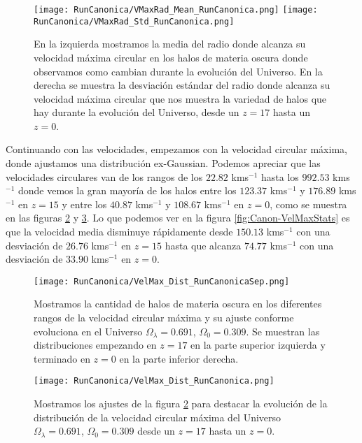 \begin{figure}[H]
    \centering
    \texttt{[image: RunCanonica/VMaxRad\_Mean\_RunCanonica.png]}
    \texttt{[image: RunCanonica/VMaxRad\_Std\_RunCanonica.png]}
    \caption[Media y desviación estándar del Radio donde se alcanza la velocidad máxima circular]{\footnotesize En la izquierda mostramos la media del radio donde alcanza su velocidad máxima circular en los halos de materia oscura donde observamos como cambian durante la evolución del Universo. En la derecha se muestra la desviación estándar del radio donde alcanza su velocidad máxima circular que nos muestra la variedad de halos que hay durante la evolución del Universo, desde un $z=17$ hasta un $z=0$.}
    \label{fig:Canon-VMaxRadStats}
\end{figure}

Continuando con las velocidades, empezamos con la velocidad circular máxima, donde ajustamos una distribución ex-Gaussian. Podemos apreciar que las velocidades circulares van de los rangos de los $22.82$ kms$^{-1}$ hasta los $992.53$ kms$^{-1}$ donde vemos la gran mayoría de los halos entre los $123.37$ kms$^{-1}$ y $176.89$ kms$^{-1}$ en $z=15$ y entre los $40.87$ kms$^{-1}$ y $108.67$ kms$^{-1}$ en $z=0$, como se muestra en las figuras \ref{fig:Canon-VelMaxDistSep} y \ref{fig:Canon-VelMaxDist}. Lo que podemos ver en la figura \ref{fig:Canon-VelMaxStats} es que la velocidad media disminuye rápidamente desde $150.13$ kms$^{-1}$ con una desviación de $26.76$ kms$^{-1}$ en $z=15$ hasta que alcanza $74.77$ kms$^{-1}$ con una desviación de $33.90$ kms$^{-1}$ en $z=0$.

\begin{figure}[H]
    \centering
    \texttt{[image: RunCanonica/VelMax\_Dist\_RunCanonicaSep.png]}
    \caption[Velocidad circular máxima]{\footnotesize Mostramos la cantidad de halos de materia oscura en los diferentes rangos de la velocidad circular máxima y su ajuste conforme evoluciona en el Universo $\Omega_\lambda = 0.691 $, $\Omega_0 = 0.309$. Se muestran las distribuciones empezando en $z=17$ en la parte superior izquierda y terminado en $z=0$ en la parte inferior derecha.}
    \label{fig:Canon-VelMaxDistSep}
\end{figure}

\begin{figure}[H]
    \centering
    \texttt{[image: RunCanonica/VelMax\_Dist\_RunCanonica.png]}
    \caption[Distribución de la velocidad circular máxima]{\footnotesize Mostramos los ajustes de la figura \ref{fig:Canon-VelMaxDistSep} para destacar la evolución de la distribución de la velocidad circular máxima del Universo $\Omega_\lambda = 0.691 $, $\Omega_0 = 0.309$ desde un $z=17$ hasta un $z=0$.}
    \label{fig:Canon-VelMaxDist}
\end{figure}


